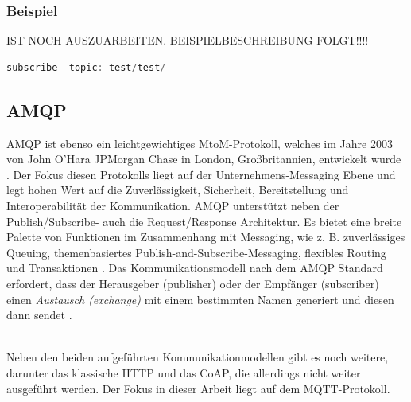             \subsubsection*{Beispiel}
            \label{subsubsec:pubsub-example}
            IST NOCH AUSZUARBEITEN. BEISPIELBESCHREIBUNG FOLGT!!!! 
            \begin{lstlisting}[language=Java, frame=lines, xleftmargin=\parindent, style=algoBericht, label={code:entity}, captionpos=b, caption={Test test}]
                subscribe -topic: test/test/
            \end{lstlisting}


    \subsection{AMQP}
    \label{subsec:amqp}
        \ac{AMQP} ist ebenso ein leichtgewichtiges \acs{MtoM}-Protokoll, welches im Jahre 2003 von John O'Hara JPMorgan Chase in London, 
        Großbritannien, entwickelt wurde \cite{Naik2017}. Der Fokus diesen Protokolls liegt auf der Unternehmens-Messaging Ebene und 
        legt hohen Wert auf die Zuverlässigkeit, Sicherheit, Bereitstellung und Interoperabilität der Kommunikation. \acs{AMQP} 
        unterstützt neben der Publish/Subscribe- auch die Request/Response Architektur. Es bietet eine breite Palette von 
        Funktionen im Zusammenhang mit Messaging, wie z. B. zuverlässiges Queuing, themenbasiertes Publish-and-Subscribe-Messaging, 
        flexibles Routing und Transaktionen \cite{Naik2017}. Das Kommunikationsmodell nach dem \acs{AMQP} Standard erfordert, dass der 
        Herausgeber (publisher) oder der Empfänger (subscriber) einen \textit{Austausch (exchange)} mit einem bestimmten Namen generiert 
        und diesen dann sendet \cite{Naik2017}. 

        \\
        \linebreak
        Neben den beiden aufgeführten Kommunikationmodellen gibt es noch weitere, darunter das klassische \ac{HTTP} und das \ac{CoAP}, die 
        allerdings nicht weiter ausgeführt werden. Der Fokus in dieser Arbeit liegt auf dem \acs{MQTT}-Protokoll. 
        
        
        
